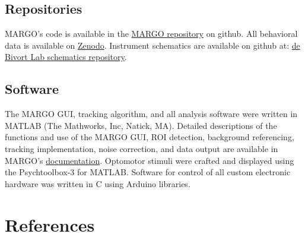 \documentclass[12pt,letterpaper]{article}
\begin{document}
\subsection*{Repositories}

MARGO's code is available in the \href{https://github.com/de-Bivort-Lab/margo}{MARGO repository} on github. All behavioral data is available on \href{https://zenodo.org/record/2596143#.XI2maRNKiRc}{Zenodo}. Instrument schematics are available on github at: \href{https://github.com/de-Bivort-Lab/dblab-schematics}{de Bivort Lab schematics repository}.

\subsection*{Software}
 
The MARGO GUI, tracking algorithm, and all analysis software were written in MATLAB (The Mathworks, Inc, Natick, MA). Detailed descriptions of the functions and use of the MARGO GUI, ROI detection, background referencing, tracking implementation, noise correction, and data output are available in MARGO's \href{https://github.com/de-Bivort-Lab/margo/wiki}{documentation}. Optomotor stimuli were crafted and displayed using the Psychtoolbox-3 for MATLAB. Software for control of all custom electronic hardware was written in C using Arduino libraries.

\section{References}



\clearpage
\end{document}
